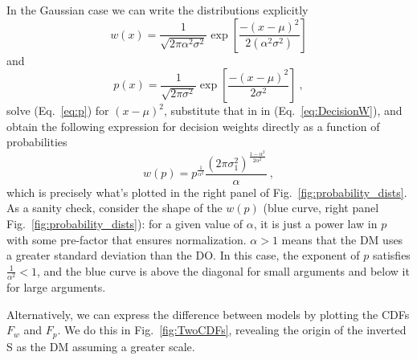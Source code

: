 \documentclass[a4paper, 12pt]{article}
\newcommand{\elabel}[1]{\label{eq:#1}}
\newcommand{\eref}[1]{(Eq.~\ref{eq:#1})}
\newcommand{\flabel}[1]{\label{fig:#1}}
\newcommand{\fref}[1]{Fig.~\ref{fig:#1}}
\newcommand{\be}{\begin{equation}}
\newcommand{\ee}{\end{equation}}
\newcommand{\MK}[1]{{\it ***MK: #1 MK***}}
\begin{document}

In the Gaussian case we can write the distributions explicitly
\be \elabel{DecisionW}
	w(x)=\frac{1}{\sqrt{2\pi \alpha^2 \sigma^2}}\exp\left[\frac{-(x -\mu )^2}{2 (\alpha^2 \sigma^2)}\right]
\ee
and
\be
	p(x)=\frac{1}{\sqrt{2\pi \sigma^2}}\exp\left[\frac{-(x -\mu )^2}{2 \sigma^2}\right] ~,
\elabel{p}
\ee
% 
solve \eref{p} for $(x -\mu)^2$, substitute that in in \eref{DecisionW}, and obtain the following expression for decision weights directly as a function of probabilities
\be
w(p)= p^{\frac{1}{\alpha^2}} \frac{\left(2\pi\sigma_1^2\right)^{\frac{1-\alpha^2}{2\alpha^2}}}{\alpha} ~,
\elabel{w_of_p}
\ee
which is precisely what's plotted in the right panel of \fref{probability_dists}. As a sanity check, consider the shape of the $w(p)$ (blue curve, right panel \fref{probability_dists}): for a given value of $\alpha$, it is just a power law in $p$ with some pre-factor that ensures normalization. $\alpha>1$ means that the DM uses a greater standard deviation than the DO. In this case, the exponent of $p$ satisfies $\frac{1}{\alpha^2}<1$, and the blue curve is above the diagonal for small arguments and below it for large arguments.

%
%

Alternatively, we can express the difference between models by plotting the CDFs $F_w$ and $F_p$. We do this in \fref{TwoCDFs}, revealing the origin of the inverted S as the DM assuming a greater scale.
\end{document}
